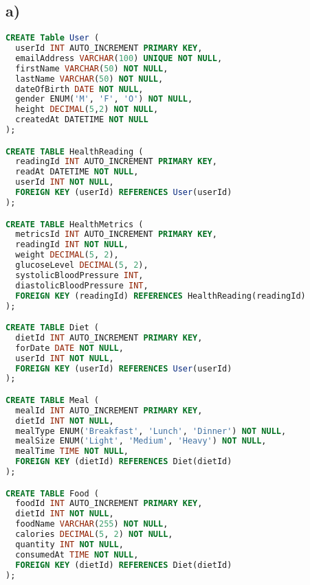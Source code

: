 \documentclass{article}
\begin{document}
\subsection*{\small a)}
\vspace{-0.25cm}
\begin{lstlisting}[language=sql]
CREATE Table User (
  userId INT AUTO_INCREMENT PRIMARY KEY,
  emailAddress VARCHAR(100) UNIQUE NOT NULL,
  firstName VARCHAR(50) NOT NULL,
  lastName VARCHAR(50) NOT NULL,
  dateOfBirth DATE NOT NULL,
  gender ENUM('M', 'F', 'O') NOT NULL,
  height DECIMAL(5,2) NOT NULL,
  createdAt DATETIME NOT NULL
);

CREATE TABLE HealthReading (
  readingId INT AUTO_INCREMENT PRIMARY KEY,
  readAt DATETIME NOT NULL,
  userId INT NOT NULL,
  FOREIGN KEY (userId) REFERENCES User(userId)
);

CREATE TABLE HealthMetrics (
  metricsId INT AUTO_INCREMENT PRIMARY KEY,
  readingId INT NOT NULL,
  weight DECIMAL(5, 2),
  glucoseLevel DECIMAL(5, 2),
  systolicBloodPressure INT,
  diastolicBloodPressure INT,
  FOREIGN KEY (readingId) REFERENCES HealthReading(readingId)
);

CREATE TABLE Diet (
  dietId INT AUTO_INCREMENT PRIMARY KEY,
  forDate DATE NOT NULL,
  userId INT NOT NULL,
  FOREIGN KEY (userId) REFERENCES User(userId)
);

CREATE TABLE Meal (
  mealId INT AUTO_INCREMENT PRIMARY KEY,
  dietId INT NOT NULL,
  mealType ENUM('Breakfast', 'Lunch', 'Dinner') NOT NULL,
  mealSize ENUM('Light', 'Medium', 'Heavy') NOT NULL,
  mealTime TIME NOT NULL,
  FOREIGN KEY (dietId) REFERENCES Diet(dietId)
);

CREATE TABLE Food (
  foodId INT AUTO_INCREMENT PRIMARY KEY,
  dietId INT NOT NULL,
  foodName VARCHAR(255) NOT NULL,
  calories DECIMAL(5, 2) NOT NULL,
  quantity INT NOT NULL,
  consumedAt TIME NOT NULL,
  FOREIGN KEY (dietId) REFERENCES Diet(dietId)
);
\end{lstlisting}
\end{document}
